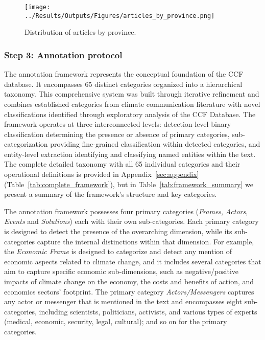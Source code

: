 \documentclass[12pt]{article}
\begin{document}
\begin{figure}[!htbp]
  \centering
  \texttt{[image: ../Results/Outputs/Figures/articles\_by\_province.png]}
  \caption{Distribution of articles by province.}
  \label{fig:province_dist}
  \end{figure}

\subsubsection{Step 3: Annotation protocol}

The annotation framework represents the conceptual foundation of the CCF database. It encompasses 65 distinct categories organized into a hierarchical taxonomy. This comprehensive system was built through iterative refinement and combines established categories from climate communication literature with novel classifications identified through exploratory analysis of the CCF Database. The framework operates at three interconnected levels: detection-level binary classification determining the presence or absence of primary categories, sub-categorization providing fine-grained classification within detected categories, and entity-level extraction identifying and classifying named entities within the text. The complete detailed taxonomy with all 65 individual categories and their operational definitions is provided in Appendix~\ref{sec:appendix} (Table~\ref{tab:complete_framework}), but in Table~\ref{tab:framework_summary} we present a summary of the framework's structure and key categories.

The annotation framework possesses four primary categories (\emph{Frames}, \emph{Actors}, \emph{Events} and \emph{Solutions}) each with their own sub-categories. Each primary category is designed to detect the presence of the overarching dimension, while its sub-categories capture the internal distinctions within that dimension. For example, the \emph{Economic Frame} is designed to categorize and detect any mention of economic aspects related to climate change, and it includes several categories that aim to capture specific economic sub-dimensions, such as negative/positive impacts of climate change on the economy, the costs and benefits of action, and economics sectors' footprint. The primary category \emph{Actors/Messengers} captures any actor or messenger that is mentioned in the text and encompasses eight sub-categories, including scientists, politicians, activists, and various types of experts (medical, economic, security, legal, cultural); and so on for the primary categories. 
\end{document}
